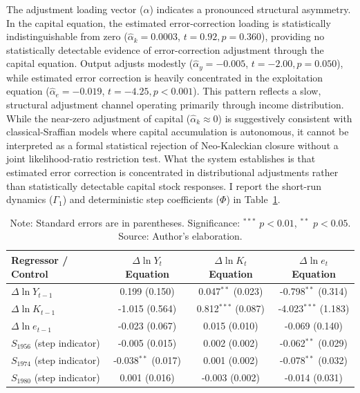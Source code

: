 The adjustment loading vector ($\alpha$) indicates a pronounced structural asymmetry. In the capital equation, the estimated error-correction loading is statistically indistinguishable from zero ($\hat{\alpha}_k = 0.0003$, $t = 0.92, p = 0.360$), providing no statistically detectable evidence of error-correction adjustment through the capital equation. Output adjusts modestly ($\hat{\alpha}_y = -0.005$, $t = -2.00, p = 0.050$), while estimated error correction is heavily concentrated in the exploitation equation ($\hat{\alpha}_e = -0.019$, $t = -4.25, p < 0.001$). This pattern reflects a slow, structural adjustment channel operating primarily through income distribution. While the near-zero adjustment of capital ($\hat{\alpha}_k \approx 0$) is suggestively consistent with classical-Sraffian models where capital accumulation is autonomous, it cannot be interpreted as a formal statistical rejection of Neo-Kaleckian closure without a joint likelihood-ratio restriction test. What the system establishes is that estimated error correction is concentrated in distributional adjustments rather than statistically detectable capital stock responses. I report the short-run dynamics ($\Gamma_1$) and deterministic step coefficients ($\Phi$) in Table~\ref{tab:s2_short_run_dynamics}.

\begin{table}[H]
\centering
\caption{Focal VECM Short-Run Dynamics and Step Controls}
\label{tab:s2_short_run_dynamics}
\footnotesize
\begin{tabular}{lccc}
\toprule
Regressor / Control & $\Delta \ln Y_t$ Equation & $\Delta \ln K_t$ Equation & $\Delta \ln e_t$ Equation \\
\midrule
\midrule
$\Delta \ln Y_{t-1}$ & 0.199 (0.150) & 0.047$^{**}$ (0.023) & -0.798$^{**}$ (0.314) \\
$\Delta \ln K_{t-1}$ & -1.015 (0.564) & 0.812$^{***}$ (0.087) & -4.023$^{***}$ (1.183) \\
$\Delta \ln e_{t-1}$ & -0.023 (0.067) & 0.015 (0.010) & -0.069 (0.140) \\
\midrule
$S_{1956}$ (step indicator) & -0.005 (0.015) & 0.002 (0.002) & -0.062$^{**}$ (0.029) \\
$S_{1974}$ (step indicator) & -0.038$^{**}$ (0.017) & 0.001 (0.002) & -0.078$^{**}$ (0.032) \\
$S_{1980}$ (step indicator) & 0.001 (0.016) & -0.003 (0.002) & -0.014 (0.031) \\
\bottomrule
\end{tabular}
\caption*{\footnotesize Note: Standard errors are in parentheses. Significance: $^{***}$ $p<0.01$, $^{**}$ $p<0.05$. Source: Author's elaboration.}
\end{table}


